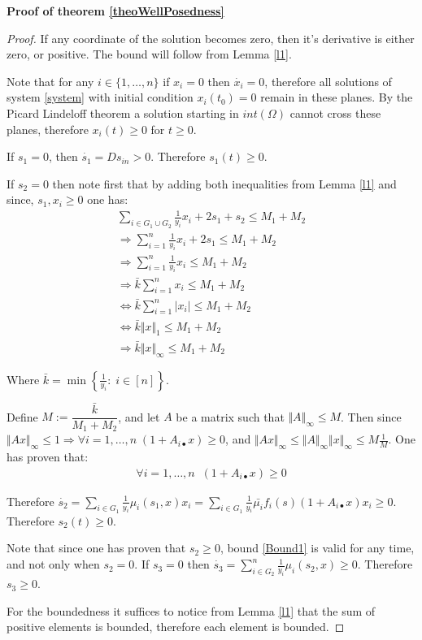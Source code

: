 \documentclass[3p,times]{elsarticle}
\begin{document}
\textbf{Proof of theorem \ref{theoWellPosedness}}

\begin{proof}
	If any coordinate of the solution becomes zero, then it's derivative is either zero, or positive. The bound will follow from Lemma \ref{l1}.
	
	Note that for any $i \in \{1,\dots, n\} $ if $x_i = 0$ then $\dot{x_{i}} = 0$, therefore all solutions of system \eqref{system} with initial condition $x_i(t_0) = 0$ remain in these planes. By the Picard Lindeloff theorem a solution starting in $int(\Omega)$ cannot cross these planes, therefore $x_i(t)\geq 0$ for $t \geq 0$.
	
	If $s_1 = 0$, then $\dot{s_1} = Ds_{in} > 0$. Therefore $s_1(t) \geq 0$.
	
	If $s_2 = 0$ then note first that by adding both inequalities from Lemma \eqref{l1} and since, $s_1,x_i \geq 0$ one has:
	\begin{align*}
	\sum \limits_{i \in G_1 \cup G_2}  \frac{1}{y_i} x_i + 2s_1 + s_2 \leq M_1 + M_2 \\
	\Rightarrow \sum \limits_{i = 1}^{n}  \frac{1}{y_i} x_i + 2s_1 \leq M_1 + M_2 \\
	\Rightarrow \sum \limits_{i = 1}^{n}  \frac{1}{y_i} x_i \leq M_1 + M_2\\ 
	\Rightarrow \bar{k} \sum  \limits_{i = 1}^{n}   x_i  \leq M_1 + M_2  \\
	\Leftrightarrow \bar{k} \sum  \limits_{i = 1}^{n}   \vert x_i \vert  \leq M_1 + M_2  \\
	\Leftrightarrow \bar{k} \Vert x \Vert_1  \leq M_1 + M_2  \\
	\Rightarrow   \bar{k} \Vert x \Vert_{\infty} \leq M_1 + M_2
	\end{align*}
	
	Where $\bar{k} = \min \left\{ \frac{1}{y_i}  : \; i\in [n] \right \}$.
	
	Define $M := \dfrac{\bar{k}}{M_1 + M_2}$, and let $A$ be a matrix such that $\Vert A \Vert_{\infty} \leq M$. Then since $\Vert Ax \Vert_{\infty} \leq 1 \Rightarrow \forall i=1,\dots,n \; (1 + A_{i\bullet}x) \geq 0 $, and $\Vert Ax \Vert_{\infty} \leq \Vert A \Vert_{\infty} \Vert x\Vert_{\infty} \leq M \frac{1}{M}$.
	One has proven that:
	\begin{align}
	\label{Bound1} \forall i=1,\dots,n \;  \;  (1 + A_{i\bullet}x) \geq 0 
	\end{align} 
	
	Therefore $\dot{s_2} = \displaystyle \sum \limits_{i \in G_1 } \frac{1}{y_i}\mu_i(s_1,x)x_i =  \sum \limits_{i \in G_1 } \frac{1}{y_i}\bar{\mu_i}f_i(s)(1+A_{i \bullet }x)x_i \geq 0$. Therefore $s_2(t) \geq 0$.
	
	Note that since one has proven that $s_2 \geq 0$, bound \eqref{Bound1} is valid for any time, and not only when $s_2 = 0$. 
	If $s_3 = 0$ then $\dot{s_3} = \sum \limits_{i \in G_2 }^{n}\frac{1}{y_i}\mu_i(s_2,x)\geq 0$. Therefore $s_3 \geq 0$.
	
	For the boundedness it suffices to notice from Lemma \ref{l1} that the sum of positive elements is bounded, therefore each element is bounded.
\end{proof}
\end{document}
